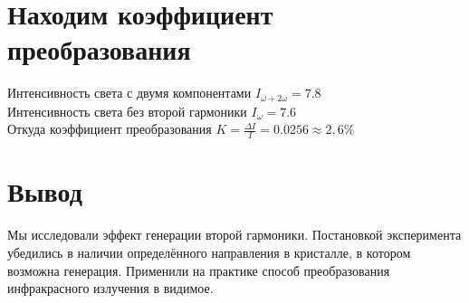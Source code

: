 \documentclass[a4paper,14pt]{article} %
\begin{document}
\section{Находим коэффициент преобразования}
Интенсивность света с двумя компонентами $I_{\omega + 2 \omega} = 7.8$\\
Интенсивность света без второй гармоники $I_{\omega} = 7.6$\\
Откуда коэффициент преобразования   $K = \frac{\Delta I}{I} = 0.0256 \approx 2,6 \%$\\

\section{Вывод}
Мы исследовали эффект генерации второй гармоники. Постановкой эксперимента убедились в наличии определённого направления в кристалле, в котором возможна генерация. Применили на практике способ преобразования инфракрасного излучения в видимое.
\end{document}
